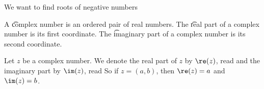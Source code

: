 

We want to find roots of negative numbers


A \t{complex number} is an ordered pair of real numbers.
The \t{real part} of a complex number is its first coordinate.
The \t{imaginary part} of a complex number is its second coordinate.



Let $z$ be a complex number.
We denote the real part of $z$ by $\re(z)$, read  and the imaginary part by $\im(z)$, read 
So if $z = (a, b)$, then $\re(z) = a$ and $\im(z) = b$.
